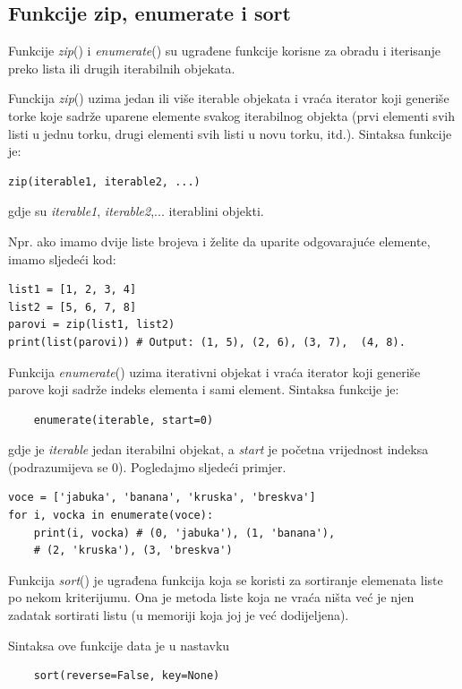 \subsection{Funkcije zip, enumerate i sort}
Funkcije  \textit{zip}() i \textit{enumerate}() su ugrađene funkcije korisne za obradu i iterisanje preko lista ili drugih iterabilnih objekata.

Funckija \textit{zip}() uzima jedan ili više iterable objekata i vraća iterator koji generiše torke koje sadrže uparene elemente svakog iterabilnog objekta (prvi elementi svih listi u jednu torku, drugi elementi svih listi u novu torku, itd.). Sintaksa funkcije je:
\begin{verbatim}
zip(iterable1, iterable2, ...)
\end{verbatim}
gdje su \emph{iterable1}, \emph{iterable2},... iterablini objekti. 

Npr. ako imamo dvije liste brojeva i želite da uparite odgovarajuće elemente, imamo sljedeći kod:
\begin{verbatim}
list1 = [1, 2, 3, 4]
list2 = [5, 6, 7, 8]
parovi = zip(list1, list2) 
print(list(parovi)) # Output: (1, 5), (2, 6), (3, 7),  (4, 8).
\end{verbatim}
Funkcija \textit{enumerate}() uzima iterativni objekat i vraća iterator koji generiše parove koji sadrže indeks elementa i sami element. Sintaksa funkcije je:
\begin{verbatim}
	enumerate(iterable, start=0)
\end{verbatim}
gdje je \textit{iterable} jedan iterabilni objekat, a \textit{start} je početna vrijednost indeksa (podrazumijeva se 0). Pogledajmo sljedeći primjer. 

\begin{verbatim}
voce = ['jabuka', 'banana', 'kruska', 'breskva']
for i, vocka in enumerate(voce):
    print(i, vocka) # (0, 'jabuka'), (1, 'banana'),
    # (2, 'kruska'), (3, 'breskva')
\end{verbatim}

Funkcija \textit{sort}() je ugrađena funkcija koja se koristi za sortiranje elemenata   liste po nekom kriterijumu. Ona je metoda liste koja ne vraća ništa već je njen zadatak sortirati listu (u memoriji koja joj je već dodijeljena).

Sintaksa ove funkcije data je u nastavku 
\begin{verbatim}
	sort(reverse=False, key=None)
\end{verbatim}


